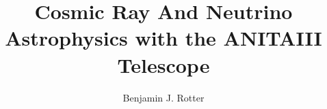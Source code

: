 \documentclass[11pt,dissertation]{uhthesis}
\title{Cosmic Ray And Neutrino Astrophysics with the ANITAIII Telescope}
\author{Benjamin J. Rotter}
\begin{document}
\maketitle

\begin{frontmatter}



%

%



\tableofcontents



\end{frontmatter}








%
\end{document}
